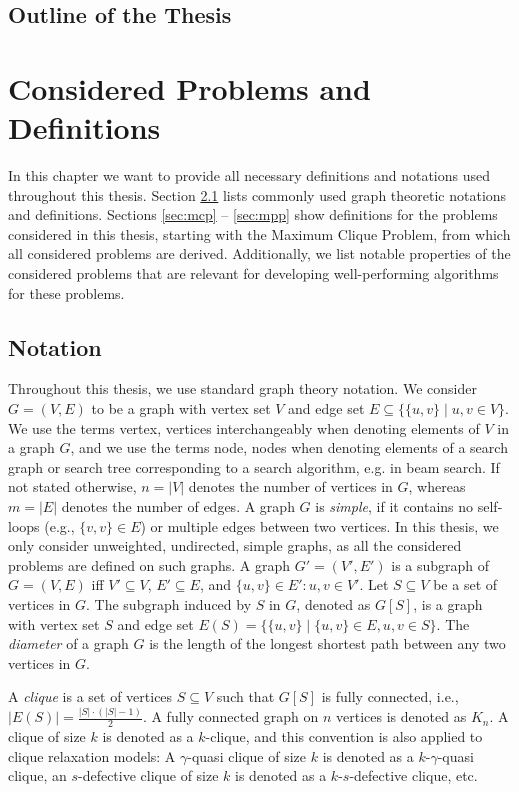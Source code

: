 \documentclass[draft,final]{vutinfth} %
\begin{document}
\section{Outline of the Thesis}

\chapter{Considered Problems and Definitions}

In this chapter we want to provide all necessary definitions and notations used throughout this thesis. Section \ref{sec:notation} lists commonly used graph theoretic notations and definitions. Sections \ref{sec:mcp} -- \ref{sec:mpp} show definitions for the problems considered in this thesis, starting with the Maximum Clique Problem, from which all considered problems are derived. Additionally, we list notable properties of the considered problems that are relevant for developing well-performing algorithms for these problems. 

\section{Notation}\label{sec:notation}

Throughout this thesis, we use standard graph theory notation. 
We consider $G = (V, E)$ to be a graph with vertex set $V$ and edge set $E \subseteq \{\{u,v\} \mid u,v \in V\}$. We use the terms vertex, vertices interchangeably when denoting elements of $V$ in a graph $G$, and we use the terms node, nodes when denoting elements of a search graph or search tree corresponding to a search algorithm, e.g. in beam search. If not stated otherwise, $n = |V|$ denotes the number of vertices in $G$, whereas $m = |E|$ denotes the number of edges. 
A graph $G$ is \emph{simple}, if it contains no self-loops (e.g.,  $\{v,v\} \in E$) or multiple edges between two vertices. In this thesis, we only consider unweighted, undirected, simple graphs, as all the considered problems are defined on such graphs. 
A graph $G' = (V', E')$ is a subgraph of $G = (V,E)$ iff $V' \subseteq V$, $E' \subseteq E$, and $\{u,v\} \in E' \colon u,v \in V'$. Let $S \subseteq V$ be a set of vertices in $G$. The subgraph induced by $S$ in $G$, denoted as $G[S]$, is a graph with vertex set $S$ and edge set $E(S) = \{ \{u,v\} \mid \{u,v\} \in E, u,v \in S \}$. 
The \emph{diameter} of a graph $G$ is the length of the longest shortest path between any two vertices in $G$. 

A \emph{clique} is a set of vertices $S \subseteq V$ such that $G[S]$ is fully connected, i.e., $|E(S)| = \frac{|S| \cdot (|S|-1)}{2}$. A fully connected graph on $n$ vertices is denoted as $K_n$. A clique of size $k$ is denoted as a $k$-clique, and this convention is also applied to clique relaxation models: A $\gamma$-quasi clique of size $k$ is denoted as a $k$-$\gamma$-quasi clique, an $s$-defective clique of size $k$ is denoted as a $k$-$s$-defective clique, etc. 
\end{document}
